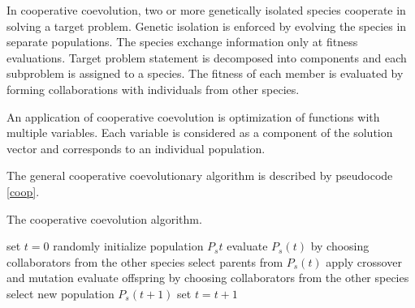 In cooperative coevolution, two or more genetically isolated species cooperate in solving a target problem. 
Genetic isolation is enforced by evolving the species in separate populations. 
The species exchange information only at fitness evaluations. 
Target problem statement is decomposed into components and each subproblem is assigned to a species. 
The fitness of each member is evaluated by forming collaborations with individuals from other species. 

An application of cooperative coevolution is optimization of functions with multiple variables. 
Each variable is considered as a component of the solution vector and corresponds to an individual population. 

The general cooperative coevolutionary algorithm is described by pseudocode \ref{coop}.

\begin{algorithm}
\caption{The cooperative coevolution algorithm.\label{coop}}
\begin{algorithmic}
\STATE set $t=0$
\STATE randomly initialize population $P_s{t}$
\ENDFOR
{}
\STATE evaluate $P_s(t)$ by choosing collaborators from the other species
\ENDFOR
{}
\STATE select parents from $P_s(t)$
\STATE apply crossover and mutation
\STATE evaluate offspring by choosing collaborators from the other species
\STATE select new population $P_s(t+1)$
\ENDFOR
\STATE set $t=t+1$
\ENDWHILE
\end{algorithmic}
\end{algorithm}

